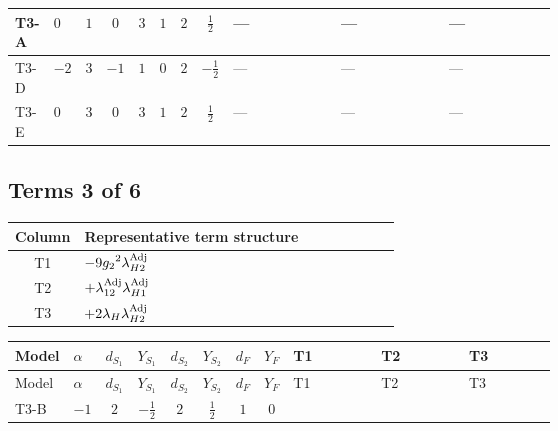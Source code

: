 \documentclass[8pt]{article}
\begin{document}
\begin{landscape}
\begin{longtable}{@{}llcccccc >{\raggedright\arraybackslash}p{0.21\linewidth} >{\raggedright\arraybackslash}p{0.21\linewidth} >{\raggedright\arraybackslash}p{0.21\linewidth}@{}}
\midrule
T3-A & $0$ & $1$ & $0$ & $3$ & $1$ & $2$ & $\frac{1}{2}$ & --- & --- & --- \\
\midrule
T3-D & $-2$ & $3$ & $-1$ & $1$ & $0$ & $2$ & $-\frac{1}{2}$ & --- & --- & --- \\
\midrule
T3-E & $0$ & $3$ & $0$ & $3$ & $1$ & $2$ & $\frac{1}{2}$ & --- & --- & --- \\
\midrule
\bottomrule
\end{longtable}
\clearpage
\subsection*{Terms 3 of 6}
\begin{center}
\begin{tabular}{@{}c >{\raggedright\arraybackslash}p{0.82\linewidth}@{}}
\toprule
Column & Representative term structure \\
\midrule
T1 & \(\displaystyle -9 {g_2}^2 {\lambda_{H2}^{\rm Adj}}\) \\
\midrule
T2 & \(\displaystyle +{\lambda_{12}^{\rm Adj}} {\lambda_{H1}^{\rm Adj}}\) \\
\midrule
T3 & \(\displaystyle +2 {\lambda_H} {\lambda_{H2}^{\rm Adj}}\) \\
\midrule
\bottomrule
\end{tabular}
\end{center}
\smallskip
\tiny
\begin{longtable}{@{}llcccccc >{\raggedright\arraybackslash}p{0.21\linewidth} >{\raggedright\arraybackslash}p{0.21\linewidth} >{\raggedright\arraybackslash}p{0.21\linewidth}@{}}
\toprule
Model & $\alpha$ & $d_{S_1}$ & $Y_{S_1}$ & $d_{S_2}$ & $Y_{S_2}$ & $d_F$ & $Y_F$ & T1 & T2 & T3 \\
\midrule
\endfirsthead
\toprule
Model & $\alpha$ & $d_{S_1}$ & $Y_{S_1}$ & $d_{S_2}$ & $Y_{S_2}$ & $d_F$ & $Y_F$ & T1 & T2 & T3 \\
\midrule
\endhead
T3-B & $-1$ & $2$ & $-\frac{1}{2}$ & $2$ & $\frac{1}{2}$ & $1$ & $0$ & \scriptsize\adjustbox{max width=\linewidth}{$\begin{gathered} -9 {g_2}^2 {\lambda_{H2}^{\rm Adj}}\end{gathered}$} & \scriptsize\adjustbox{max width=\linewidth}{$\begin{gathered} +{\lambda_{12}^{\rm Adj}} {\lambda_{H1}^{\rm Adj}}\end{gathered}$} & \scriptsize\adjustbox{max width=\linewidth}{$\begin{gathered} +2 {\lambda_H} {\lambda_{H2}^{\rm Adj}}\end{gathered}$} \\

\end{longtable}
\end{landscape}
\end{document}
